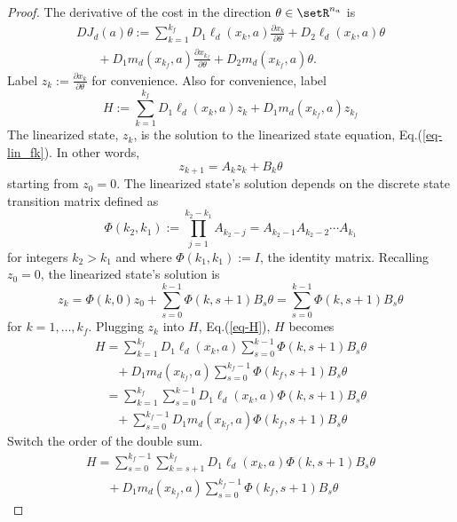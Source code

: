 \documentclass[letterpaper, 10pt, conference]{ieeeconf}
\begin{document}
\begin{proof}
The derivative of the cost in the direction $\theta\in\setR^{n_a}$ is
\begin{equation}
\begin{array}{l}
DJ_d(a)\theta:=\sum_{k=1}^{k_f}D_1\ell_d(x_k,a)\frac{\partial x_k}{\partial \theta} + D_2\ell_d(x_k,a)\theta \\\hspace{20pt}+ D_1m_d(x_{k_f},a)\frac{\partial x_{k_f}}{\partial \theta} + D_2m_d(x_{k_f},a)\theta.
\end{array}
\label{eq-DJ_dot_theta}
\end{equation}
Label $z_k:=\frac{\partial x_{k}}{\partial \theta}$ for convenience. Also for convenience, label 
\begin{equation}
H:=\sum_{k=1}^{k_f}D_1\ell_d(x_k,a) z_k + D_1m_d(x_{k_f},a) z_{k_f}
\label{eq-H}
\end{equation}
The linearized state, $z_k$, is the solution to the linearized state equation, Eq.(\ref{eq-lin_fk}).  In other words,
\[
z_{k+1} = A_kz_k + B_k\theta
\]
starting from $z_0 = 0$.  The linearized state's solution depends on the discrete state transition matrix defined as
\[
\Phi(k_2,k_1):=\prod_{j = 1}^{k_2-k_1} A_{k_2-j} = A_{k_2-1}A_{k_2-2}\cdots A_{k_1}
\]
for integers $k_2>k_1$ and where $\Phi(k_1,k_1):=I$, the identity matrix.  Recalling $z_0 = 0$, the linearized state's solution is
\[
z_k = \Phi(k,0)z_0 + \sum_{s = 0}^{k-1}\Phi(k,s+1)B_s\theta = \sum_{s = 0}^{k-1}\Phi(k,s+1)B_s\theta
\]
for $k = 1,\ldots,k_f$.  Plugging $z_k$ into $H$, Eq.(\ref{eq-H}), $H$ becomes
\[
\begin{array}{l}
H = \sum_{k=1}^{k_f}D_1\ell_d(x_k,a) \sum_{s = 0}^{k-1}\Phi(k,s+1)B_s\theta \\\hspace{20pt}+ D_1m_d(x_{k_f},a) \sum_{s = 0}^{k_f-1}\Phi(k_f,s+1)B_s\theta
\\\hspace{10pt} = \sum_{k=1}^{k_f}\sum_{s = 0}^{k-1}D_1\ell_d(x_k,a) \Phi(k,s+1) B_s\theta \\\hspace{20pt}+  \sum_{s = 0}^{k_f-1} D_1m_d(x_{k_f},a)\Phi(k_f,s+1)B_s\theta
\end{array}
\]
Switch the order of the double sum.  
\[
\begin{array}{l}
H = \sum_{s=0}^{k_f-1}\sum_{k = s+1}^{k_f}D_1\ell_d(x_k,a) \Phi(k,s+1) B_s\theta \\\hspace{20pt}+ D_1m_d(x_{k_f},a) \sum_{s = 0}^{k_f-1}\Phi(k_f,s+1)B_s\theta

\end{array}\]
\end{proof}
\end{document}
